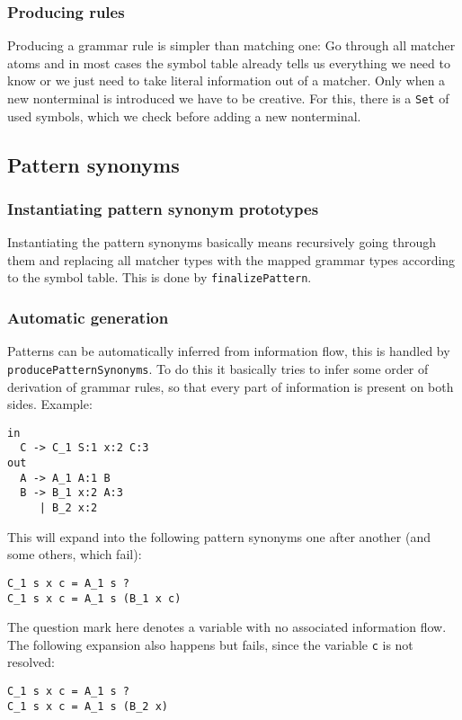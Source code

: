 \documentclass[a4paper]{article}
\begin{document}
\subsubsection*{Producing rules}
Producing a grammar rule is simpler than matching one: Go through all matcher atoms and in most cases the symbol table already tells us everything we need to know or we just need to take literal information out of a matcher. Only when a new nonterminal is introduced we have to be creative. For this, there is a \lstinline{Set} of used symbols, which we check before adding a new nonterminal.

\subsection*{Pattern synonyms}
\subsubsection*{Instantiating pattern synonym prototypes}
Instantiating the pattern synonyms basically means recursively going through them and replacing all matcher types with the mapped grammar types according to the symbol table. This is done by \lstinline{finalizePattern}.

\subsubsection*{Automatic generation}
Patterns can be automatically inferred from information flow, this is handled by \lstinline{producePatternSynonyms}. To do this it basically tries to infer some order of derivation of grammar rules, so that every part of information is present on both sides. Example:
\begin{lstlisting}[language=transformer]
in
  C -> C_1 S:1 x:2 C:3
out
  A -> A_1 A:1 B
  B -> B_1 x:2 A:3
     | B_2 x:2
\end{lstlisting}
This will expand into the following pattern synonyms one after another (and some others, which fail):
\begin{lstlisting}[language=transformer]
C_1 s x c = A_1 s ?              
C_1 s x c = A_1 s (B_1 x c)
\end{lstlisting}
The question mark here denotes a variable with no associated information flow. The following expansion also happens but fails, since the variable \verb|c| is not resolved:
\begin{lstlisting}[language=transformer]
C_1 s x c = A_1 s ?
C_1 s x c = A_1 s (B_2 x)
\end{lstlisting}
\end{document}
